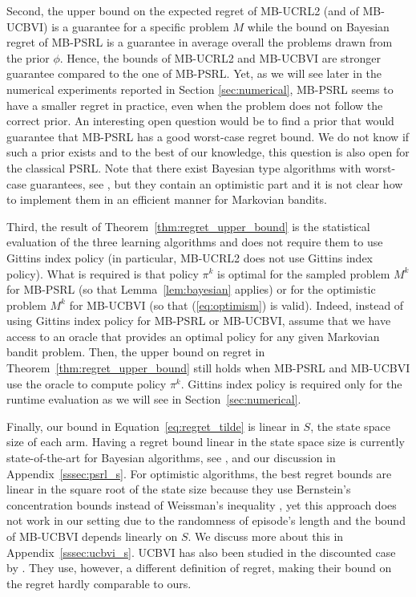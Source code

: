 Second, the upper bound on the expected regret of MB-UCRL2 (and of MB-UCBVI) is a guarantee for a specific problem $M$ while the bound on Bayesian regret of MB-PSRL is a guarantee in average overall the problems drawn from the prior $\phi$. Hence, the bounds of MB-UCRL2 and MB-UCBVI are stronger guarantee compared to the one of MB-PSRL.  Yet, as we will see later in the numerical experiments reported in Section \ref{sec:numerical}, MB-PSRL seems to have a smaller regret in practice, even when the problem does not follow the correct prior.
An interesting open question would be to find a prior that would guarantee that MB-PSRL has a good worst-case regret bound. We do not know if such a prior exists and to the best of our knowledge, this question is also open for the classical PSRL. Note that there exist Bayesian type algorithms with worst-case guarantees, see \eg, \cite{ishfaq2021randomized,agrawal2021improved,wang2020reinforcement,agrawal2017posterior} but they contain an optimistic part and it is not clear how to implement them in an efficient manner for Markovian bandits.

Third, the result of Theorem~\ref{thm:regret_upper_bound} is the statistical evaluation of the three learning algorithms and does not require them to use Gittins index policy (in particular, MB-UCRL2 does not use Gittins index policy).
What is required is that policy $\pi^k$ is optimal for the sampled problem $M^k$ for MB-PSRL (so that Lemma~\ref{lem:bayesian} applies) or for the optimistic problem $M^k$ for MB-UCBVI (so that (\ref{eq:optimism}) is valid).
Indeed, instead of using Gittins index policy for MB-PSRL or MB-UCBVI, assume that we have access to an oracle that provides an optimal policy for any given Markovian bandit problem.
Then, the upper bound on regret in Theorem~\ref{thm:regret_upper_bound} still holds when MB-PSRL and MB-UCBVI use the oracle to compute policy $\pi^k$.
Gittins index policy is required only for the runtime evaluation as we will see in Section~\ref{sec:numerical}.

Finally, our bound in Equation~\eqref{eq:regret_tilde} is linear in $S$, the state space size of each arm. Having a regret bound linear in the state space size is currently state-of-the-art for Bayesian algorithms, see \eg, \cite{agrawal2017posterior,ouyang2017learning} and our discussion in Appendix~\ref{sssec:psrl_s}. For optimistic algorithms, the best regret bounds are linear in the square root of the state size because they use  Bernstein's concentration bounds instead of Weissman's inequality \cite{azar2017minimax}, yet this approach does not work in our setting due to the randomness of episode's length and the bound of MB-UCBVI depends linearly on $S$. We discuss more about this in Appendix~\ref{sssec:ucbvi_s}. UCBVI has also been studied in the discounted case by \cite{zhou2021nearly}. They use, however, a different definition of regret, making their bound on the regret hardly comparable to ours.

